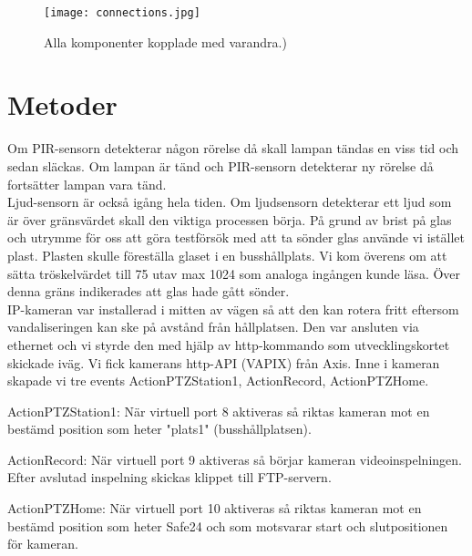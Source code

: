 \begin{figure}[h]

  \texttt{[image: connections.jpg]}
  \caption{Alla komponenter kopplade med varandra.)}
  \label{fig:connections}
\end{figure}
\clearpage



\section{Metoder} 
Om PIR-sensorn detekterar någon rörelse då skall lampan tändas en viss tid och sedan släckas. Om lampan är tänd och PIR-sensorn detekterar ny rörelse då fortsätter lampan vara tänd.\\

 Ljud-sensorn är också igång hela tiden. Om ljudsensorn detekterar ett ljud som är över gränsvärdet skall den viktiga processen börja. På grund av brist på glas och utrymme för oss att göra testförsök med att ta sönder glas använde vi istället plast. Plasten skulle föreställa glaset i en busshållplats. Vi kom överens om att sätta tröskelvärdet till 75 utav max 1024 som analoga ingången kunde läsa. Över denna gräns indikerades att glas hade gått sönder.\\

IP-kameran var installerad i mitten av vägen så att den kan rotera fritt eftersom vandaliseringen kan ske på avstånd från hållplatsen. Den var ansluten via ethernet och vi styrde den med hjälp av http-kommando som utvecklingskortet skickade iväg. Vi fick kamerans http-API (VAPIX) från Axis. Inne i kameran skapade vi tre events ActionPTZStation1, ActionRecord, ActionPTZHome.

ActionPTZStation1: När virtuell port 8 aktiveras så riktas kameran mot en bestämd position som  heter "plats1" (busshållplatsen).

ActionRecord: När virtuell port 9 aktiveras så börjar kameran videoinspelningen. Efter avslutad inspelning skickas klippet till FTP-servern.

ActionPTZHome: När virtuell port 10 aktiveras så riktas kameran mot en bestämd position som heter Safe24 och som motsvarar start och slutpositionen för kameran.\\




 








